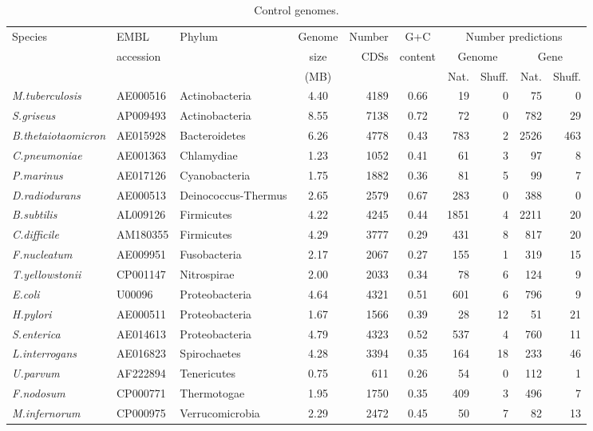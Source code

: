 

\hspace{-10mm}
\begin{table}
\caption[]{Control genomes. }\label{table:1}
\begin{tabular}{lllcrcrrrr}
\hline
\hline
Species & EMBL      & Phylum & Genome & Number & G+C    & \multicolumn{4}{c}{Number predictions}               \\
        & accession &        & size   & CDSs   & content & \multicolumn{2}{c}{Genome} & \multicolumn{2}{c}{Gene} \\
        &           &        & (MB)   &        &         & Nat. & Shuff.             & Nat. & Shuff.             \\
\hline
\emph{M.tuberculosis} & AE000516 & Actinobacteria & 4.40 & 4189 & 0.66 & 19 & 0 & 75 & 0 \\ 
\emph{S.griseus} & AP009493 & Actinobacteria & 8.55 & 7138 & 0.72 & 72 & 0 & 782 & 29 \\ 
\emph{B.thetaiotaomicron} & AE015928 & Bacteroidetes & 6.26 & 4778 & 0.43 & 783 & 2 & 2526 & 463 \\ 
\emph{C.pneumoniae} & AE001363 & Chlamydiae & 1.23 & 1052 & 0.41 & 61 & 3 & 97 & 8 \\ 
\emph{P.marinus} & AE017126 & Cyanobacteria & 1.75 & 1882 & 0.36 & 81 & 5 & 99 & 7 \\ 
\emph{D.radiodurans} & AE000513 & Deinococcus-Thermus & 2.65 & 2579 & 0.67 & 283 & 0 & 388 & 0 \\ 
\emph{B.subtilis} & AL009126 & Firmicutes & 4.22 & 4245 & 0.44 & 1851 & 4 & 2211 & 20 \\ 
\emph{C.difficile} & AM180355 & Firmicutes & 4.29 & 3777 & 0.29 & 431 & 8 & 817 & 20 \\ 
\emph{F.nucleatum} & AE009951 & Fusobacteria & 2.17 & 2067 & 0.27 & 155 & 1 & 319 & 15 \\ 
\emph{T.yellowstonii} & CP001147 & Nitrospirae & 2.00 & 2033 & 0.34 & 78 & 6 & 124 & 9 \\ 
\emph{E.coli} & U00096 & Proteobacteria & 4.64 & 4321 & 0.51 & 601 & 6 & 796 & 9 \\ 
\emph{H.pylori} & AE000511 & Proteobacteria & 1.67 & 1566 & 0.39 & 28 & 12 & 51 & 21 \\ 
\emph{S.enterica} & AE014613 & Proteobacteria & 4.79 & 4323 & 0.52 & 537 & 4 & 760 & 11 \\ 
\emph{L.interrogans} & AE016823 & Spirochaetes & 4.28 & 3394 & 0.35 & 164 & 18 & 233 & 46 \\ 
\emph{U.parvum} & AF222894 & Tenericutes & 0.75 & 611 & 0.26 & 54 & 0 & 112 & 1 \\ 
\emph{F.nodosum} & CP000771 & Thermotogae & 1.95 & 1750 & 0.35 & 409 & 3 & 496 & 7 \\ 
\emph{M.infernorum} & CP000975 & Verrucomicrobia & 2.29 & 2472 & 0.45 & 50 & 7 & 82 & 13 \\ 

\hline
\hline
  \end{tabular}
\end{table}
